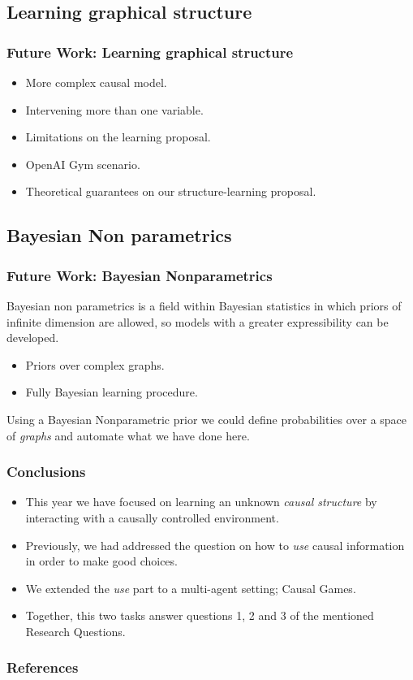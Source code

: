 \documentclass{beamer}
\theoremstyle{plain}
\begin{document}
\subsection{Learning graphical structure}
\begin{frame}
\frametitle{Future Work: Learning graphical structure}
\begin{itemize}
\item More complex causal model.
\item Intervening more than one variable.
\item Limitations on the learning proposal.
\item OpenAI Gym scenario.
\item Theoretical guarantees on our structure-learning proposal.
\end{itemize} 
\end{frame}

\subsection{Bayesian Non parametrics}
\begin{frame}
\frametitle{Future Work: Bayesian Nonparametrics}
Bayesian non parametrics is a field within Bayesian statistics in which priors of infinite dimension are allowed, so models with a greater expressibility can be developed.
\begin{itemize}
\item Priors over complex graphs.
\item Fully Bayesian learning procedure.
\end{itemize}
Using a Bayesian Nonparametric prior we could define probabilities over a space of \textit{graphs} and automate what we have done here.
\end{frame}

\begin{frame}
\frametitle{Conclusions}
\begin{itemize}
\item This year we have focused on learning an unknown \textit{causal structure} by interacting with a causally controlled environment.
\item Previously, we had addressed the question on how to \textit{use} causal information in order to make good choices. 
\item We extended the \textit{use} part to a multi-agent setting; Causal Games.
\item Together, this two tasks answer questions 1, 2 and 3 of the mentioned Research Questions.
\end{itemize}
\end{frame}

\begin{frame}[allowframebreaks]
\frametitle{References}


\end{frame}
\end{document}
